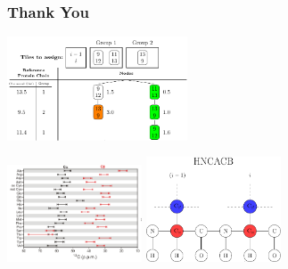 \documentclass{beamer}
\begin{document}
\begin{frame}
	\frametitle{Thank You} 
	\begin{center}
	\includegraphics[width=0.4\textwidth]{graphic/time_line}\hspace{2em}
	\resizebox{!}{.3\paperheight}{}
	\end{center}
	\begin{center}
	\includegraphics[width=0.3\textwidth]{carbon}\hspace{2em}
	\includegraphics[width=0.3\textwidth]{diagram}

\end{center}
\end{frame}
\end{document}
